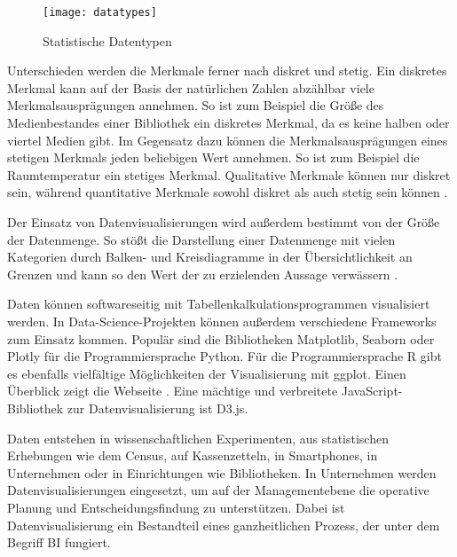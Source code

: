  
 \begin{figure}[h]
    \centering
        \texttt{[image: datatypes]}
        \caption{Statistische Datentypen}
        \label{fig:data types}
\end{figure}


Unterschieden werden die Merkmale ferner nach diskret und stetig.
Ein diskretes Merkmal kann auf der Basis der natürlichen Zahlen abzählbar viele Merkmalsausprägungen annehmen.
So ist zum Beispiel die Größe des Medienbestandes einer Bibliothek ein diskretes Merkmal, da es keine halben oder viertel Medien gibt.
Im Gegensatz dazu können die Merkmalsausprägungen eines stetigen Merkmals jeden beliebigen Wert annehmen. So ist zum Beispiel die Raumtemperatur ein stetiges Merkmal.
Qualitative Merkmale können nur diskret sein, während quantitative Merkmale sowohl diskret als auch stetig sein können \cite[vgl.][S. 102 f.]{kirk_data_2019}. 

Der Einsatz von Datenvisualisierungen wird außerdem bestimmt von der Größe der Datenmenge.
So stößt die Darstellung einer Datenmenge mit vielen Kategorien durch Balken- und Kreisdiagramme 
in der Übersichtlichkeit an Grenzen und kann so den Wert der zu erzielenden Aussage verwässern \cite[vgl.][S. 5 ff.]{few_show_2012}. 

Daten können softwareseitig mit Tabellenkalkulationsprogrammen visualisiert werden.
In Data-Science-Projekten können außerdem verschiedene Frameworks zum Einsatz kommen. Populär sind die Bibliotheken Matplotlib, Seaborn oder Plotly für 
die Programmiersprache Python. Für die Programmiersprache R gibt es ebenfalls vielfältige Möglichkeiten der Visualisierung mit
ggplot. Einen Überblick zeigt die Webseite  \cite[vgl.][]{witherley_chartmaker_2020}.
Eine mächtige und verbreitete JavaScript-Bibliothek zur Datenvisualisierung ist D3.js.


Daten entstehen in wissenschaftlichen Experimenten, aus statistischen Erhebungen wie 
dem Census, auf Kassenzetteln, in Smartphones, in Unternehmen oder in Einrichtungen wie Bibliotheken. 
In Unternehmen werden Datenvisualisierungen eingesetzt, um auf der Managementebene die operative Planung und Entscheidungsfindung zu unterstützen.
Dabei ist Datenvisualisierung ein Bestandteil eines ganzheitlichen Prozess, der unter dem Begriff \acrfull{BI} fungiert. 



